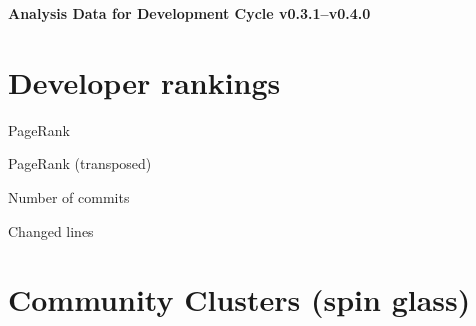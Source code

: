 \documentclass{article}
\begin{document}
\setlength{\parindent}{0pt}
\begin{center}
\begin{Large}
\textbf{Analysis Data for Development Cycle v0.3.1--v0.4.0}
\end{Large}
\end{center}
\section{Developer rankings}
\begin{small}\renewcommand{\tabcolsep}{1pt}
\begin{minipage}{0.5\linewidth}
PageRank\\

\end{minipage}%
\begin{minipage}{0.5\linewidth}
PageRank (transposed)\\

\end{minipage}

\renewcommand{\tabcolsep}{5pt}
\begin{minipage}{0.5\linewidth}
Number of commits\\

\end{minipage}%
\begin{minipage}{0.5\linewidth}
Changed lines\\

\end{minipage}
\end{small}
\newpage\section{Community Clusters (spin glass)}
\end{document}
